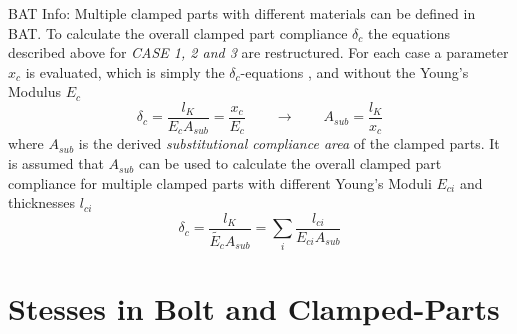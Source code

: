 \begin{colbox}{BAT Info:}
  Multiple clamped parts with different materials can be defined in BAT. To calculate the overall 
  clamped part compliance $\delta_c$ the equations described above for \emph{CASE 1, 2 and 3} are
  restructured. For each case a parameter $x_c$ is evaluated, which is simply the $\delta_c$-equations 
  ,  and  without the Young's Modulus $E_c$
  \begin{equation}
    \delta_c = \frac{l_K}{E_c A_{sub}}=\frac{x_c}{E_c} \qquad \rightarrow \qquad A_{sub}=\frac{l_K}{x_c}
  \end{equation}
  where $A_{sub}$ is the derived \emph{substitutional compliance area} of the clamped parts.
  It is assumed that $A_{sub}$ can be used to calculate the overall clamped part compliance for multiple 
  clamped parts with different Young's Moduli $E_{ci}$ and thicknesses $l_{ci}$
  \begin{equation}
    \delta_c = \frac{l_K}{\tilde{E_c} A_{sub}} = \sum_i \frac{l_{ci}}{E_{ci} A_{sub}}
  \end{equation}
\end{colbox}

\section{Stesses in Bolt and Clamped-Parts}
